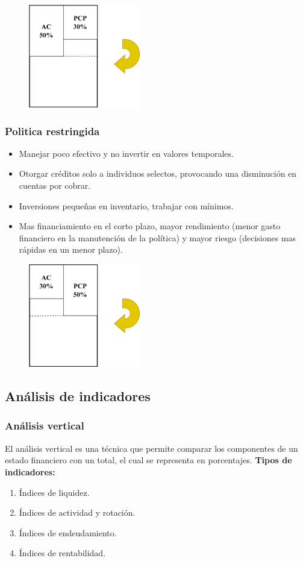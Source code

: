\documentclass{templateNote}
\begin{document}
\begin{figure}[H]
    \centering
    \includegraphics[height=4.5cm]{img/polirelajada.png}
\end{figure}

\subsubsection{Politica restringida}
\begin{itemize}
    \item Manejar poco efectivo y no invertir en valores temporales.
    \item Otorgar créditos solo a individuos selectos, provocando una disminución en cuentas por cobrar.
    \item Inversiones pequeñas en inventario, trabajar con mínimos.
    \item Mas financiamiento en el corto plazo, mayor rendimiento (menor gasto financiero en la manutención de la política) y mayor riesgo (decisiones mas rápidas en un menor plazo).
\end{itemize}
\begin{figure}[H]
    \centering
    \includegraphics[height=4.5cm]{img/polirestrict.png}
\end{figure}
\newpage

\subsection{Análisis de indicadores}
\subsubsection{Análisis vertical}
\noindent El análisis vertical es una técnica que permite comparar los componentes de un estado financiero con un total, el cual se representa en porcentajes.
\textbf{Tipos de indicadores:}
\begin{enumerate}
    \item Índices de liquidez.
    \item Índices de actividad y rotación.
    \item Índices de endeudamiento.
    \item Índices de rentabilidad.
\end{enumerate}
\end{document}
